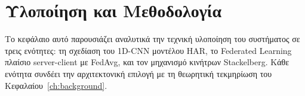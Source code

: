 
\chapter{Υλοποίηση και Μεθοδολογία}
\label{ch:implementation}

Το κεφάλαιο αυτό παρουσιάζει αναλυτικά την τεχνική υλοποίηση του συστήματος σε τρεις ενότητες: τη σχεδίαση του 1D-CNN μοντέλου HAR, το Federated Learning πλαίσιο server-client με FedAvg, και τον μηχανισμό κινήτρων Stackelberg. Κάθε ενότητα συνδέει την αρχιτεκτονική επιλογή με τη θεωρητική τεκμηρίωση του Κεφαλαίου~\ref{ch:background}.




